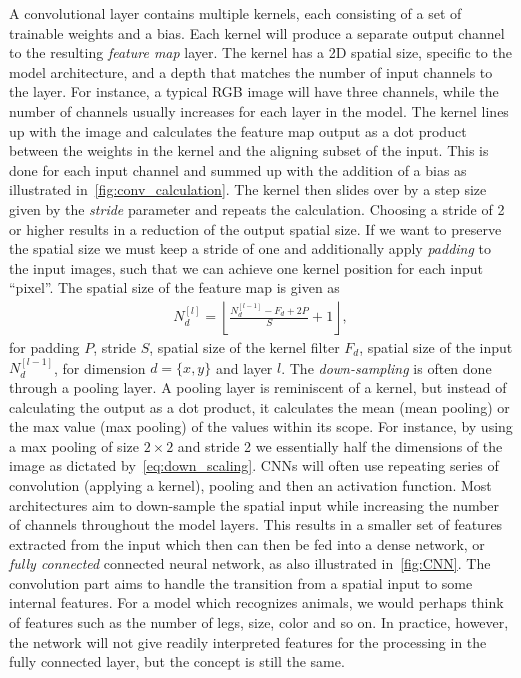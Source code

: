 A convolutional layer contains multiple kernels, each consisting of a set of
trainable weights and a bias. Each kernel will produce a separate output channel
to the resulting \textit{feature map} layer. The kernel has a 2D spatial size,
specific to the model architecture, and a depth that matches the number of input
channels to the layer. For instance, a typical RGB image will have three
channels, while the number of channels usually increases for each layer in the
model. The kernel lines up with the image and calculates the feature map output
as a dot product between the weights in the kernel and the aligning subset of
the input. This is done for each input channel and summed up with the addition
of a bias as illustrated in~\cref{fig:conv_calculation}. The kernel then slides over by a
step size given by the \textit{stride} parameter and repeats the
calculation. Choosing a stride of 2 or higher results in a reduction of the
output spatial size. If we want to preserve the spatial size we must keep a
stride of one and additionally apply \textit{padding} to the input images, such
that we can achieve one kernel position for each input ``pixel''. The spatial
size of the feature map is given as
\begin{align}
  N_d^{[l]} = \left\lfloor \frac{N_d^{[l-1]} - F_d + 2P}{S} + 1 \right\rfloor,
  \label{eq:down_scaling}
\end{align}
for padding $P$, stride $S$, spatial size of the kernel filter $F_d$, spatial
size of the input $N_d^{[l-1]}$, for dimension $d = \{x, y\}$ and layer $l$. The
\textit{down-sampling} is often done through a pooling layer. A pooling layer is
reminiscent of a kernel, but instead of calculating the output as a dot product,
it calculates the mean (mean pooling) or the max value (max pooling) of the
values within its scope. For instance, by using a max pooling of size $2 \times
2$ and stride 2 we essentially half the dimensions of the image as dictated
by~\cref{eq:down_scaling}. \acrshort{CNN}s will often use repeating series of
convolution (applying a kernel), pooling and then an activation function. Most
architectures aim to down-sample the spatial input while increasing the number
of channels throughout the model layers. This results in a smaller set of
features extracted from the input which then can then be fed into a dense
network, or \textit{fully connected} connected neural network, as also
illustrated in~\cref{fig:CNN}. The convolution part aims to
handle the transition from a spatial input to some internal features. For a model which recognizes animals, we would perhaps think of features such as the number of legs, size, color and so on. In practice, however, the network will not give readily interpreted features for the processing in the fully connected layer, but the concept is still the same. 


